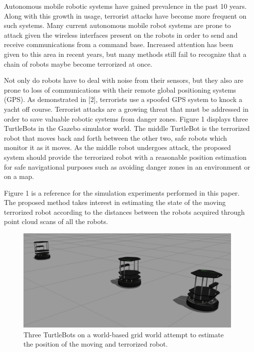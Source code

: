 \documentclass[conference]{IEEEtran}
\begin{document}
Autonomous mobile robotic systems have gained prevalence in the past 10 years. Along with this
growth in usage, terrorist attacks have become more frequent on such systems.
Many current autonomous mobile robot systems are prone to attack given the wireless interfaces present
on the robots in order to send and receive communications from a command base. Increased attention has
been given to this area in recent years, but many methods still fail to recognize that a chain of robots
maybe become terrorized at once.
\par
Not only do robots have to deal with noise from their sensors, but they also are prone to loss of communications
with their remote global positioning systems (GPS). As demonstrated in [2], terrorists use a spoofed GPS system
to knock a yacht off course. Terrorist attacks are a growing threat that must be addressed in order to save
valuable robotic systems from danger zones. Figure 1 displays three TurtleBots in the Gazebo simulator world. The middle TurtleBot is the terrorized robot that moves back and forth between the other two, safe robots which monitor it as it moves. As the middle robot undergoes attack, the proposed system should provide the terrorized robot with a reasonable position estimation for safe navigational purposes such as avoiding danger zones in an environment or on a map.
\par 
Figure 1 is a reference for the simulation experiments performed in this paper. The proposed method takes
interest in estimating the state of the moving terrorized robot according to the distances between the robots acquired through point cloud scans of all the robots.
\par
\begin{figure}[!ht]
  \centering
    \includegraphics[scale=.2]{sim1}
  \caption{Three TurtleBots on a world-based grid world attempt to estimate the position of the moving and terrorized robot.}
\end{figure}
\end{document}
